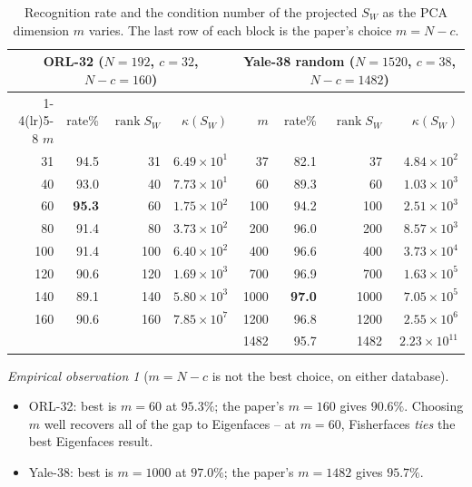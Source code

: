 \documentclass[11pt]{article}
\theoremstyle{definition}
\theoremstyle{remark}
\newtheorem*{observation}{Empirical observation}
\newcommand{\Sw}{S_W}
\newcommand{\rank}{\operatorname{rank}}
\begin{document}
\begin{table}[htbp]
\centering
\setlength{\tabcolsep}{4.2pt}
\begin{tabular}{rrrr@{\hskip 1.2em}rrrr}
\toprule
\multicolumn{4}{c}{\textbf{ORL-32} ($N=192$, $c=32$, $N-c=160$)} &
\multicolumn{4}{c}{\textbf{Yale-38 random} ($N=1520$, $c=38$, $N-c=1482$)} \\
\cmidrule(lr){1-4}\cmidrule(lr){5-8}
$m$ & rate\% & $\rank\Sw$ & $\kappa(\Sw)$ & $m$ & rate\% & $\rank\Sw$ & $\kappa(\Sw)$ \\
\midrule
 31 & 94.5 &  31 & $6.49\times10^{1}$ &   37 & 82.1 &   37 & $4.84\times10^{2}$ \\
 40 & 93.0 &  40 & $7.73\times10^{1}$ &   60 & 89.3 &   60 & $1.03\times10^{3}$ \\
 60 & \textbf{95.3} &  60 & $1.75\times10^{2}$ &  100 & 94.2 &  100 & $2.51\times10^{3}$ \\
 80 & 91.4 &  80 & $3.73\times10^{2}$ &  200 & 96.0 &  200 & $8.57\times10^{3}$ \\
100 & 91.4 & 100 & $6.40\times10^{2}$ &  400 & 96.6 &  400 & $3.73\times10^{4}$ \\
120 & 90.6 & 120 & $1.69\times10^{3}$ &  700 & 96.9 &  700 & $1.63\times10^{5}$ \\
140 & 89.1 & 140 & $5.80\times10^{3}$ & 1000 & \textbf{97.0} & 1000 & $7.05\times10^{5}$ \\
160 & 90.6 & 160 & $7.85\times10^{7}$ & 1200 & 96.8 & 1200 & $2.55\times10^{6}$ \\
    &      &     &                    & 1482 & 95.7 & 1482 & $2.23\times10^{11}$ \\
\bottomrule
\end{tabular}
\caption{Recognition rate and the condition number of the projected $\Sw$ as the
PCA dimension $m$ varies. The last row of each block is the paper's choice
$m=N-c$.}
\label{tab:msweep}
\end{table}

\begin{observation}[$m=N-c$ is not the best choice, on either database]
\leavevmode
\begin{itemize}[nosep]
\item ORL-32: best is $m=60$ at $\mathbf{95.3\%}$; the paper's $m=160$ gives
  $\mathbf{90.6\%}$. Choosing $m$ well recovers all of the gap to Eigenfaces --
  at $m=60$, Fisherfaces \emph{ties} the best Eigenfaces result.
\item Yale-38: best is $m=1000$ at $\mathbf{97.0\%}$; the paper's $m=1482$ gives
  $\mathbf{95.7\%}$.
\end{itemize}
\end{observation}
\end{document}
